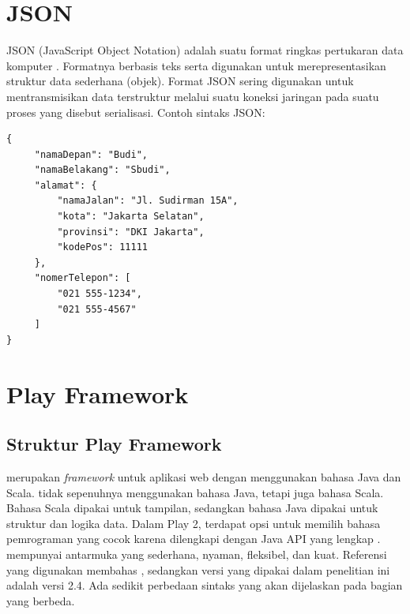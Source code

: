 \section{JSON}
\label{sec:json}
JSON (JavaScript Object Notation) adalah suatu format ringkas pertukaran data komputer \cite{json}. Formatnya berbasis teks serta digunakan untuk merepresentasikan struktur data sederhana (objek). Format JSON sering digunakan untuk mentransmisikan data terstruktur melalui suatu koneksi jaringan pada suatu proses yang disebut serialisasi.
Contoh sintaks JSON:
\begin{lstlisting}
{
     "namaDepan": "Budi",
     "namaBelakang": "Sbudi",
     "alamat": {
         "namaJalan": "Jl. Sudirman 15A",
         "kota": "Jakarta Selatan",
         "provinsi": "DKI Jakarta",
         "kodePos": 11111
     },
     "nomerTelepon": [ 
         "021 555-1234",
         "021 555-4567"
     ]
}
\end{lstlisting}


\section{Play Framework}
\label{sec:play}
\subsection{Struktur Play Framework}
\play \cite{playforjava} merupakan \textit{framework} untuk aplikasi web dengan menggunakan bahasa Java dan Scala. \play tidak sepenuhnya menggunakan bahasa Java, tetapi juga bahasa Scala. Bahasa Scala dipakai untuk tampilan, sedangkan bahasa Java dipakai untuk struktur dan logika data. Dalam Play 2, terdapat opsi untuk memilih bahasa pemrograman yang cocok karena dilengkapi dengan Java API yang lengkap . \play mempunyai antarmuka yang sederhana, nyaman, fleksibel, dan kuat. Referensi \cite{playforjava} yang digunakan membahas , sedangkan versi \play yang dipakai dalam penelitian ini adalah versi 2.4. Ada sedikit perbedaan sintaks yang akan dijelaskan pada bagian yang berbeda.
%

